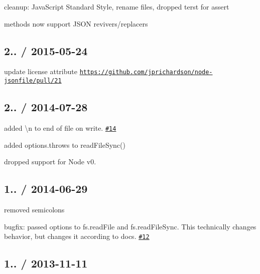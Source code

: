 \begin{DoxyItemize}
\item cleanup\+: Java\+Script Standard Style, rename files, dropped terst for assert
\item methods now support J\+S\+ON revivers/replacers
\end{DoxyItemize}

\subsection*{2.. / 2015-\/05-\/24 }


\begin{DoxyItemize}
\item update license attribute \href{https://github.com/jprichardson/node-jsonfile/pull/21}{\tt https\+://github.\+com/jprichardson/node-\/jsonfile/pull/21}
\end{DoxyItemize}

\subsection*{2.. / 2014-\/07-\/28 }


\begin{DoxyItemize}
\item added {\ttfamily \textbackslash{}n} to end of file on write. \href{https://github.com/jprichardson/node-jsonfile/pull/14}{\tt \#14}
\item added {\ttfamily options.\+throws} to {\ttfamily read\+File\+Sync()}
\item dropped support for Node v0.
\end{DoxyItemize}

\subsection*{1.. / 2014-\/06-\/29 }


\begin{DoxyItemize}
\item removed semicolons
\item bugfix\+: passed {\ttfamily options} to {\ttfamily fs.\+read\+File} and {\ttfamily fs.\+read\+File\+Sync}. This technically changes behavior, but changes it according to docs. \href{https://github.com/jprichardson/node-jsonfile/issues/12}{\tt \#12}
\end{DoxyItemize}

\subsection*{1.. / 2013-\/11-\/11 }


